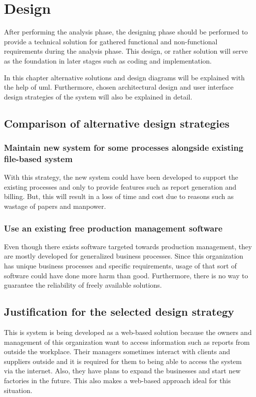 \documentclass[12pt]{report}
\begin{document}
\newpage
\chapter{Design}
After performing the analysis phase, the designing phase should be performed to provide a technical solution for gathered functional and non-functional requirements during the analysis phase. This design, or rather solution will serve as the foundation in later stages such as coding and implementation.

In this chapter alternative solutions and design diagrams will be explained with the help of \acrshort{uml}. Furthermore, chosen architectural design and user interface design strategies of the system will also be explained in detail.

\section{Comparison of alternative design strategies}

\subsection{Maintain new system for some processes alongside existing file-based system}
With this strategy, the new system could have been developed to support the existing processes and only to provide features such as report generation and billing. But, this will result in a loss of time and cost due to reasons such as wastage of papers and manpower.

\subsection{Use an existing free production management software}
Even though there exists software targeted towards production management, they are mostly developed for generalized business processes. Since this organization has unique business processes and specific requirements, usage of that sort of software could have done more harm than good. Furthermore, there is no way to guarantee the reliability of freely available solutions.

\section{Justification for the selected design strategy}
This is system is being developed as a web-based solution because the owners and management of this organization want to access information such as reports from outside the workplace. Their managers sometimes interact with clients and suppliers outside and it is required for them to being able to access the system via the internet. Also, they have plans to expand the businesses and start new factories in the future. This also makes a web-based approach ideal for this situation.
\end{document}
